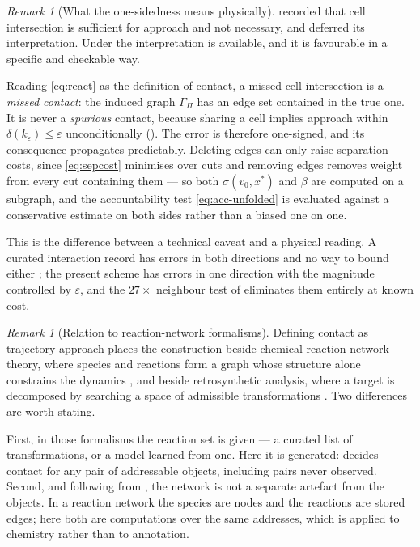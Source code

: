 \documentclass[11pt,twocolumn,a4paper]{article}
\theoremstyle{thmstyle}
\theoremstyle{definition}
\theoremstyle{remark}
\newtheorem{remark}[theorem]{Remark}
\newcommand{\Gph}{\Gamma}
\newcommand{\flo}{\beta}
\newcommand{\str}{\sigma}
\newcommand{\Proc}{\Pi}
\newcommand{\eps}{\varepsilon}
\begin{document}
\begin{remark}[What the one-sidedness means physically]
\label{rem:onesided-physical}
 recorded that cell intersection is sufficient
for approach and not necessary, and deferred its interpretation. Under
 the interpretation is available, and it is
favourable in a specific and checkable way.

Reading \eqref{eq:react} as the definition of contact, a missed cell
intersection is a \emph{missed contact}: the induced graph
$\Gph_\Proc$ has an edge set contained in the true one. It is never a
\emph{spurious} contact, because sharing a cell implies approach within
$\delta(k_\eps) \leq \eps$ unconditionally (). The
error is therefore one-signed, and its consequence propagates
predictably. Deleting edges can only raise separation costs, since
\eqref{eq:sepcost} minimises over cuts and removing edges removes
weight from every cut containing them --- so both $\str(v_0,x^{*})$ and
$\flo$ are computed on a subgraph, and the accountability test
\eqref{eq:acc-unfolded} is evaluated against a conservative estimate on
both sides rather than a biased one on one.

This is the difference between a technical caveat and a physical
reading. A curated interaction record has errors in both directions and
no way to bound either \citep{landrum2018}; the present scheme has
errors in one direction with the magnitude controlled by $\eps$, and
the $27\times$ neighbour test of  eliminates
them entirely at known cost.
\end{remark}

\begin{remark}[Relation to reaction-network formalisms]
\label{rem:reaction-networks}
Defining contact as trajectory approach places the construction beside
chemical reaction network theory, where species and reactions form a
graph whose structure alone constrains the dynamics
\citep{feinberg1987}, and beside retrosynthetic analysis, where a
target is decomposed by searching a space of admissible transformations
\citep{corey1969,segler2018}. Two differences are worth stating.

First, in those formalisms the reaction set is given --- a curated list
of transformations, or a model learned from one. Here it is generated:
 decides contact for any pair of addressable
objects, including pairs never observed. Second, and following from
, the network is not a separate artefact from the
objects. In a reaction network the species are nodes and the reactions
are stored edges; here both are computations over the same addresses,
which is  applied to chemistry rather than to
annotation.
\end{remark}
\end{document}

